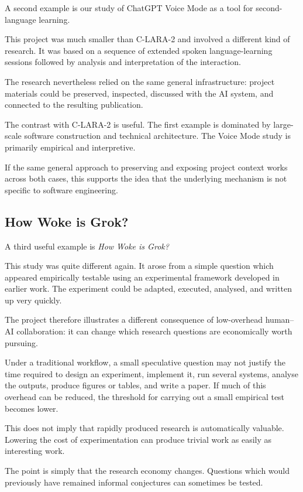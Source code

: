 A second example is our study of ChatGPT Voice Mode as a tool for second-language learning.

This project was much smaller than C-LARA-2 and involved a different kind of research. It was based on a sequence of extended spoken language-learning sessions followed by analysis and interpretation of the interaction.

The research nevertheless relied on the same general infrastructure: project materials could be preserved, inspected, discussed with the AI system, and connected to the resulting publication.

The contrast with C-LARA-2 is useful. The first example is dominated by large-scale software construction and technical architecture. The Voice Mode study is primarily empirical and interpretive.

If the same general approach to preserving and exposing project context works across both cases, this supports the idea that the underlying mechanism is not specific to software engineering.


\subsection{How Woke is Grok?}

A third useful example is \emph{How Woke is Grok?}

This study was quite different again. It arose from a simple question which appeared empirically testable using an experimental framework developed in earlier work. The experiment could be adapted, executed, analysed, and written up very quickly.

The project therefore illustrates a different consequence of low-overhead human--AI collaboration: it can change which research questions are economically worth pursuing.

Under a traditional workflow, a small speculative question may not justify the time required to design an experiment, implement it, run several systems, analyse the outputs, produce figures or tables, and write a paper. If much of this overhead can be reduced, the threshold for carrying out a small empirical test becomes lower.

This does not imply that rapidly produced research is automatically valuable. Lowering the cost of experimentation can produce trivial work as easily as interesting work.

The point is simply that the research economy changes. Questions which would previously have remained informal conjectures can sometimes be tested.

